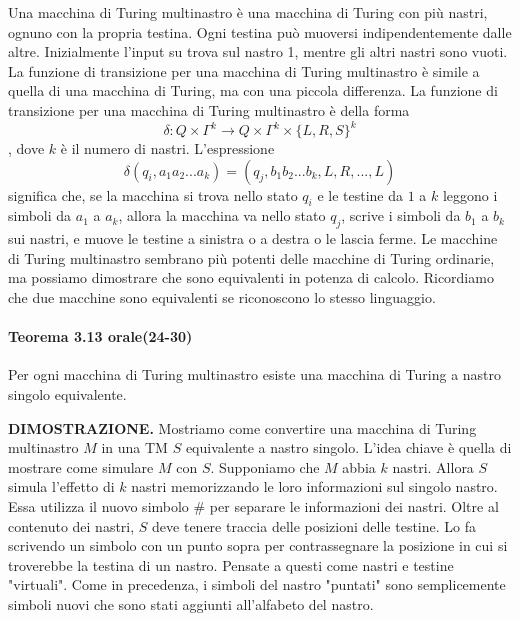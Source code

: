 \documentclass{article}
\begin{document}
Una macchina di Turing multinastro è una macchina di Turing con più nastri, ognuno con la propria testina.
Ogni testina può muoversi indipendentemente dalle altre.
Inizialmente l'input su trova sul nastro 1, mentre gli altri nastri sono vuoti.
La funzione di transizione per una macchina di Turing multinastro è simile a quella di una macchina di Turing, ma con una piccola differenza.
La funzione di transizione per una macchina di Turing multinastro è della forma 
$$
\delta: Q \times \Gamma^k \rightarrow Q \times \Gamma^k \times \{L,R,S\}^k
$$,
dove $k$ è il numero di nastri. L'espressione
$$
\delta(q_i,a_1a_2...a_k) = (q_j,b_1b_2...b_k,L,R,...,L)
$$
significa che, se la macchina si trova nello stato $q_i$ e le testine da $1$ a $k$ leggono i simboli da $a_1$ a $a_k$, allora la macchina va nello stato $q_j$, scrive i simboli da $b_1$ a $b_k$ sui nastri, e muove le testine a sinistra o a destra o le lascia ferme.
Le macchine di Turing multinastro sembrano più potenti delle macchine di Turing ordinarie, ma possiamo dimostrare che sono equivalenti in potenza di calcolo.
Ricordiamo che due macchine sono equivalenti se riconoscono lo stesso linguaggio.

\newpage
\paragraph{Teorema 3.13 orale(24-30)}
\label{teorema-3.13}
\text{ }

\begin{tcolorbox}[colback=blue!10!white, colframe=blue!50!black, title=Teorema 3.13 (orale 24-30)]
    Per ogni macchina di Turing multinastro esiste una macchina di Turing a nastro singolo equivalente.
\end{tcolorbox}

\textbf{DIMOSTRAZIONE.}
Mostriamo come convertire una macchina di Turing multinastro $M$ in una TM $S$ equivalente a nastro singolo.
L'idea chiave è quella di mostrare come simulare $M$ con $S$.
Supponiamo che $M$ abbia $k$ nastri.
Allora $S$ simula l'effetto di $k$ nastri memorizzando le loro informazioni sul singolo nastro.
Essa utilizza il nuovo simbolo $\#$ per separare le informazioni dei nastri.
Oltre al contenuto dei nastri, $S$ deve tenere traccia delle posizioni delle testine.
Lo fa scrivendo un simbolo con un punto sopra per contrassegnare la posizione in cui si troverebbe la testina di un nastro.
Pensate a questi come nastri e testine "virtuali".
Come in precedenza, i simboli del nastro "puntati" sono semplicemente simboli nuovi che sono stati aggiunti all'alfabeto del nastro.
\end{document}
